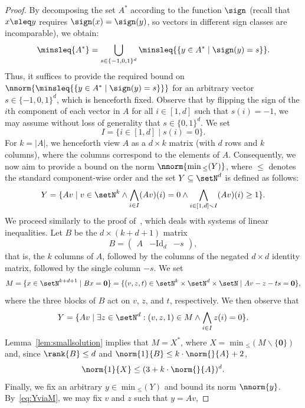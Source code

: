 \begin{proof}
By decomposing the set $A^*$ according to the function $\sign$
 (recall that $x\sleq y$ requires $\sign(x)=\sign(y)$, so vectors in
 different sign classes are incomparable), we obtain:
		\[\minsleq{A^*}=\bigcup_{s\in \{-1,0,1\}^d}\minsleq{\{y\in A^*
	\mid \sign(y)=s\}}.\]
	Thus, it suffices to provide the required bound on
	$\nnorm{\minsleq{\{y\in A^* \mid \sign(y)=s\}}}$ 
	for an arbitrary vector  $s\in\{-1,0,1\}^d$, which is henceforth fixed.
Observe that by flipping the sign of the $i$th component of each
	vector in $A$ for all $i\in[1,d]$ such that $s(i)=-1$, we may
	assume without loss of generality that $s\in \{0,1\}^d$. We
	set  \[I=\{i\in[1,d]\mid s(i)=0\}.\]
	For $k=|A|$, we henceforth view $A$ as a $d\times k$ matrix
	(with $d$ rows and $k$ columns), where
the columns correspond to the elements of $A$.
	Consequently, we now aim to provide a bound on the
	norm $\nnorm{\min{}_{\leq}(Y)}$, where $\leq$
	denotes the
	standard component-wise order and the set $Y\subseteq \setN^d$
	is defined as follows:
	\[Y=\{Av \mid v\in\setN^k
	\land \bigwedge_{i\in I}(Av)(i)=0\land
	\bigwedge_{i\in[1,d]\smallsetminus I}(Av)(i)\geq 1\}.\]
We proceed similarly to the proof
	of~\cite[Corollary~1]{DBLP:conf/rta/Pottier91}, which deals with
systems of linear inequalities.
Let $B$ be the $d \times (k+d+1)$ matrix
\[B=\left(\begin{array}{c|c|c} A & -\mathrm{Id}_d & -s\end{array}\right),\]
that is, the $k$ columns of $A$, followed by the columns of the negated
$d\times d$ identity matrix, followed by the single column $-s$.
We set 
	\[M=\{x\in\setN^{k+d+1}\mid
	Bx=\mathbf{0}\}=\{(v,z,t)\in\setN^k\times\setN^d\times\setN\mid
	Av-z-ts=\mathbf{0}\},\]
where the three blocks of $B$ act on $v$, $z$, and $t$, respectively.
	We then observe that 
	\begin{equation}\label{eq:YviaM}
		Y=\{Av\mid \exists z\in\setN^d: (v,z,1)\in M\land
	\bigwedge_{i\in I}z(i)=0\}.
	\end{equation}
 Lemma~\ref{lem:smallsolution} implies that $M=X^*$, 
		where $X=\min{}_{\leq}(M\smallsetminus\{\mathbf{0}\})$ and,
		since $\rank{B}\leq d$ and $\norm{1}{B}\leq
		k\cdot\norm{}{A}+2$,
	\begin{equation}\label{eq:XboundforM}
		\norm{1}{X}\leq (3+k\cdot\norm{}{A})^d.
	\end{equation}
Finally, we fix an arbitrary  $y\in \min{}_{\leq}(Y)$ and bound its
	norm $\nnorm{y}$.
	By~\eqref{eq:YviaM}, we may fix $v$ and $z$ such that $y=Av$,

\end{proof}
